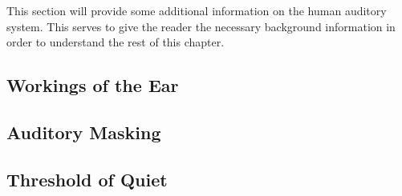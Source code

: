 This section will provide some additional information on the human auditory system.
This serves to give the reader the necessary background information in order to understand the rest of this chapter.

\subsection{Workings of the Ear}
\subsection{Auditory Masking}
\subsection{Threshold of Quiet}
